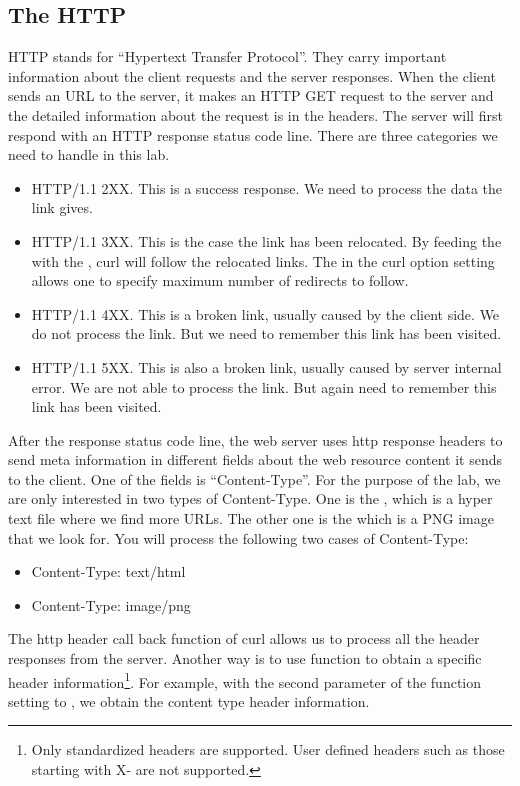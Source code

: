 \subsection{The HTTP}
HTTP stands for ``Hypertext Transfer Protocol''. They carry important information about the client requests and the server responses. When the client sends an URL to the server, it makes an HTTP GET request to the server and the detailed information about the request is in the headers. The server will first respond with an HTTP response status code line. There are three categories we need to handle in this lab.
\begin{itemize}
\item HTTP/1.1 2XX. This is a success response. We need to process the data the link gives.
\item HTTP/1.1 3XX. This is the case the link has been relocated. By feeding the  with the , curl will follow the relocated links.  The  in the curl option setting allows one to specify maximum number of redirects to follow.
\item HTTP/1.1 4XX. This is a broken link, usually caused by the client side. We do not process the link. But we need to remember this link has been visited.
\item HTTP/1.1 5XX. This is also a broken link, usually caused by server internal error. We are not able to process the link. But again need to remember this link has been visited.
\end{itemize}

After the response status code line, the web server uses http response headers to send meta information in different fields about the web resource content it sends to the client. One of the fields is ``Content-Type''. For the purpose of the lab, we are only interested in two types of Content-Type. One is the , which is a hyper text file where we find more URLs. The other one is the  which is a PNG image that we look for. You will process the following two cases of Content-Type:
\begin{itemize}
\item Content-Type: text/html
\item Content-Type: image/png
\end{itemize}
The http header call back function of curl allows us to process all the header responses from the server.
Another way is to use  function to obtain a specific header information\footnote{Only standardized headers are supported. User defined headers such as those starting with X- are not supported.}. For example, with the second parameter of the function setting to , we obtain the content type header information.

